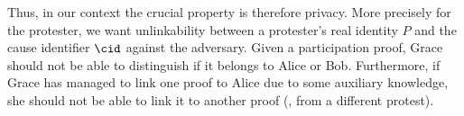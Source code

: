 Thus, in our context the crucial property is therefore privacy.
More precisely for the protester, we want unlinkability between a protester's real identity \(P\) and the cause identifier \(\cid\) against the adversary.
Given a participation proof, Grace should not be able to distinguish if it belongs to Alice or Bob.
Furthermore, if Grace has managed to link one proof to Alice due to some 
auxiliary knowledge, she should not be able to link it to another proof (\eg, 
from a different protest).



